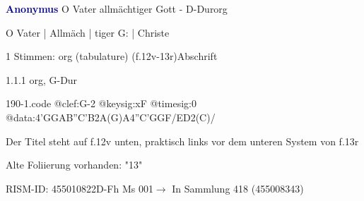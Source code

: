 \documentclass[twocolumn, 12pt]{book}
\begin{document}
\par \vspace{16pt} \textcolor{darkblue}{\textbf{Anonymus  }}\hfillplus{\textbf{[190]}}\newline O Vater allmächtiger Gott - D-Dur\newline org
\par \begin{itshape} O Vater | Allmäch | tiger G: | Christe\end{itshape} 
\par \textcolor{darkblue}{}  1 Stimmen: org (tabulature)  (f.12v-13r)\newline Abschrift
\par 1.1.1  org, G-Dur  
\begin{filecontents*}{190-1.code}
@clef:G-2
@keysig:xF
@timesig:0
@data:4'GGAB''C'B2A(G)A4''C'GGF/ED2(C)/
\end{filecontents*}
\newline %
\par Der Titel steht auf f.12v unten, praktisch links vor dem unteren System von f.13r
\par Alte Foliierung vorhanden: "13"
\par RISM-ID: 455010822\newline D-Fh  Ms 001\newline $\rightarrow$ In Sammlung 418 (455008343)
      
\end{document}
